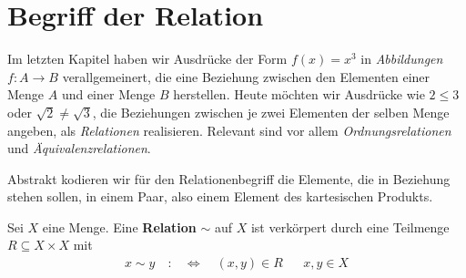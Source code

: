 %                                                                 
%
%
%


\section{Begriff der Relation}

Im letzten Kapitel haben wir Ausdrücke der Form $f(x)=x^3$ in \textit{Abbildungen} $f:A\to B$ verallgemeinert, die eine Beziehung zwischen den Elementen einer Menge $A$ und einer Menge $B$ herstellen. Heute möchten wir Ausdrücke wie $2\leq 3$ oder $\sqrt{2}\neq \sqrt{3}$, die Beziehungen zwischen je zwei Elementen der selben Menge angeben, als \textit{Relationen} realisieren. Relevant sind vor allem \textit{Ordnungsrelationen} und \textit{Äquivalenzrelationen}.

Abstrakt kodieren wir für den Relationenbegriff die Elemente, die in Beziehung
stehen sollen, in einem Paar, also einem Element des kartesischen
Produkts.
\begin{de}
	Sei $X$ eine Menge. Eine \textbf{Relation} $\sim$ auf $X$ ist verkörpert durch eine Teilmenge $R\subseteq X\times X$ mit
\begin{align*}
 x\sim y\quad :&\Leftrightarrow\quad (x,y)\in R && x,y\in X
\end{align*}
\end{de}


